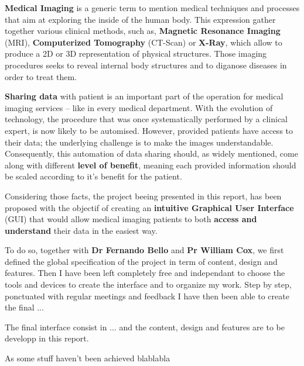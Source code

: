 \textbf{Medical Imaging} is a generic term to mention medical techniques and processes that aim at exploring the inside of the human body. This expression gather together various clinical methods, such as, \textbf{Magnetic Resonance Imaging} (MRI), \textbf{Computerized Tomography} (CT-Scan) or \textbf{X-Ray}, which allow to produce a 2D or 3D representation of physical structures. Those imaging procedures seeks to reveal internal body structures and to diganose diseases in order to treat them. 

\newline \vspace{5mm}

\textbf{Sharing data} with patient is an important part of the operation for medical imaging services -- like in every medical department.  With the evolution of technology, the procedure that was once systematically performed by a clinical expert, is now likely to be automised. However, provided patients have access to their data; the underlying challenge is to make the images understandable. Consequently, this automation  of data sharing should, as widely mentioned, come along with different \textbf{level of benefit}, meaning each provided information should be scaled according to it's benefit for the patient. 

\newline \vspace{5mm}

Considering those facts, the project beeing presented in this report, has been proposed with the objectif of creating an \textbf{intuitive Graphical User Interface} (GUI) that would allow medical imaging patients to both \textbf{access and understand} their data in the easiest way. 

\newline \vspace{5mm}
To do so, together with \textbf{Dr Fernando Bello} and \textbf{Pr William Cox}, we first defined the global specification of the project in term of content, design and features. 
Then I have been left completely free and independant to choose the tools and devices to create the interface and to organize my work.
Step by step, ponctuated with regular meetings and feedback I have then been able to create the final ... 


\newline \vspace{5mm}
The final interface consist in ... and the content, design and features are to be developp in this report.

\newline \vspace{5mm}
As some stuff haven't been achieved blablabla




